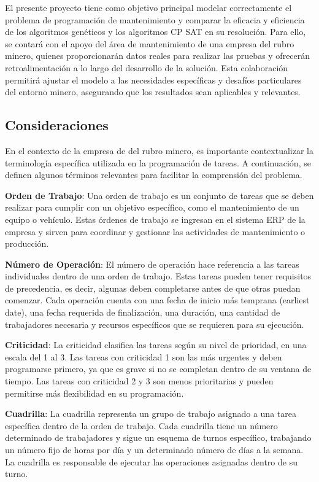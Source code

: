 \documentclass{article}
\begin{document}
El presente proyecto tiene como objetivo principal modelar correctamente el problema de programación de mantenimiento y comparar la eficacia y eficiencia de los algoritmos genéticos y los algoritmos CP SAT en su resolución. Para ello, se contará con el apoyo del área de mantenimiento de una empresa del rubro minero, quienes proporcionarán datos reales para realizar las pruebas y ofrecerán retroalimentación a lo largo del desarrollo de la solución. Esta colaboración permitirá ajustar el modelo a las necesidades específicas y desafíos particulares del entorno minero, asegurando que los resultados sean aplicables y relevantes.

\subsection{Consideraciones}
En el contexto de la empresa de del rubro minero, es importante contextualizar la terminología específica utilizada en la programación de tareas. A continuación, se definen algunos términos relevantes para facilitar la comprensión del problema.

\textbf{Orden de Trabajo}: Una orden de trabajo es un conjunto de tareas que se deben realizar para cumplir con un objetivo específico, como el mantenimiento de un equipo o vehículo. Estas órdenes de trabajo se ingresan en el sistema ERP de la empresa y sirven para coordinar y gestionar las actividades de mantenimiento o producción.

\textbf{Número de Operación}: El número de operación hace referencia a las tareas individuales dentro de una orden de trabajo. Estas tareas pueden tener requisitos de precedencia, es decir, algunas deben completarse antes de que otras puedan comenzar. Cada operación cuenta con una fecha de inicio más temprana (earliest date), una fecha requerida de finalización, una duración, una cantidad de trabajadores necesaria y recursos específicos que se requieren para su ejecución.

\textbf{Criticidad}: La criticidad clasifica las tareas según su nivel de prioridad, en una escala del 1 al 3. Las tareas con criticidad 1 son las más urgentes y deben programarse primero, ya que es grave si no se completan dentro de su ventana de tiempo. Las tareas con criticidad 2 y 3 son menos prioritarias y pueden permitirse más flexibilidad en su programación.

\textbf{Cuadrilla}: La cuadrilla representa un grupo de trabajo asignado a una tarea específica dentro de la orden de trabajo. Cada cuadrilla tiene un número determinado de trabajadores y sigue un esquema de turnos específico, trabajando un número fijo de horas por día y un determinado número de días a la semana. La cuadrilla es responsable de ejecutar las operaciones asignadas dentro de su turno.
\end{document}
